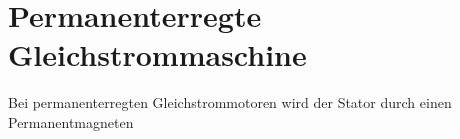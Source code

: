 \section{Permanenterregte Gleichstrommaschine}

Bei permanenterregten Gleichstrommotoren wird der Stator durch einen Permanentmagneten